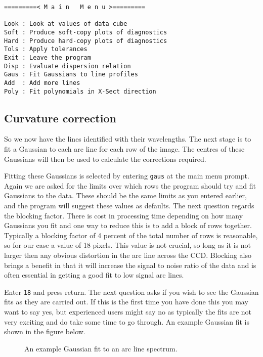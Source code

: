 {\scspec{\small}{ }
\begin{verbatim}
=========< M a i n   M e n u >=========

Look : Look at values of data cube
Soft : Produce soft-copy plots of diagnostics
Hard : Produce hard-copy plots of diagnostics
Tols : Apply tolerances
Exit : Leave the program
Disp : Evaluate dispersion relation
Gaus : Fit Gaussians to line profiles
Add  : Add more lines
Poly : Fit polynomials in X-Sect direction
\end{verbatim}
}

\subsection{Curvature correction}

So we now have the lines identified with their wavelengths. The next stage is to fit a Gaussian to each arc line for each row of the image. The centres of these Gaussians will then be used to calculate the corrections required.

Fitting these Gaussians is selected by entering {\tt gaus} at the main menu prompt. Again we are asked for the limits over which rows the program should try and fit Gaussians to the data. These should be the same limits as you entered earlier, and the program will suggest these values as defaults. The next question regards the blocking factor. There is cost in processing time depending on how many Gaussians you fit and one way to reduce this is to add a block of rows together. Typically a blocking factor of 4 percent of the total number of rows is reasonable, so for our case a value of 18 pixels. This value is not crucial, so long as it is not larger  then any obvious distortion in the arc line across the CCD. Blocking also brings a benefit in that it will increase the signal to noise ratio of the data and is often essential in getting a good fit to low signal arc lines.

Enter {\tt 18} and press return. The next question asks if you wish to see the Gaussian fits as they are carried out. If this is the first time you have done this you may want to say yes, but experienced users might say no as typically the fits are not very exciting and do take some time to go through. An example Gaussian fit is shown in  {the figure below}.

\begin{figure}
\begin{center}
{\leavevmode\epsfysize=136mm}

\parbox{140mm}{
\caption{An example Gaussian fit to an arc line spectrum.}
\label{arclinefit}
}
\end{center}
\end{figure}


